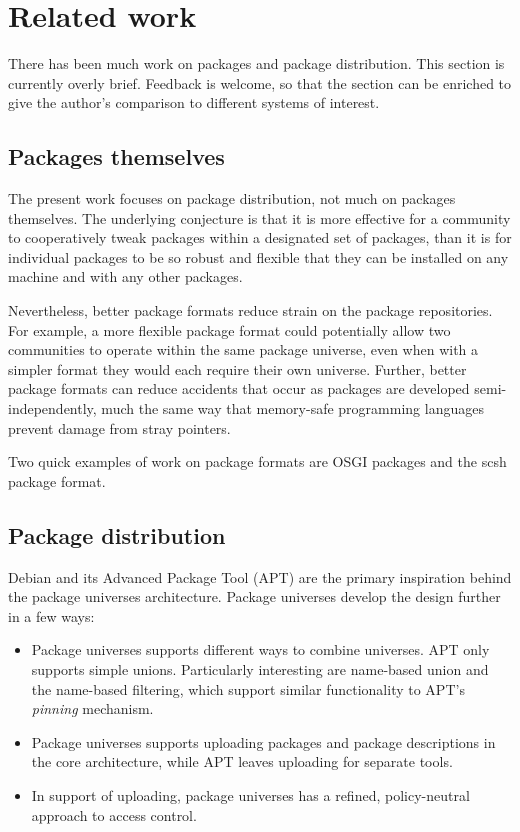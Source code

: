 \documentclass{article}
\begin{document}
\section{Related work}
There has been much work on packages and package distribution.  This
section is currently overly brief.  Feedback is welcome, so that the
section can be enriched to give the author's comparison to different
systems of interest.


\subsection{Packages themselves}
The present work focuses on package distribution, not much on packages
themselves.  The underlying conjecture is that it is more effective
for a community to cooperatively tweak packages within a designated
set of packages, than it is for individual packages to be so robust
and flexible that they can be installed on any machine and with any
other packages.


Nevertheless, better package formats reduce strain on the package
repositories.  For example, a more flexible package format could
potentially allow two communities to operate within the same package
universe, even when with a simpler format they would each require
their own universe.  Further, better package formats can reduce
accidents that occur as packages are developed semi-independently,
much the same way that memory-safe programming languages prevent
damage from stray pointers.

Two quick examples of work on package formats are OSGI packages
and the scsh package format.



\subsection{Package distribution}

Debian and its Advanced Package Tool (APT)
are the primary inspiration behind the package universes architecture.
Package universes develop the design further in a few ways:
\begin{itemize}
\item Package universes supports different ways to combine universes.
      APT only supports simple unions.  Particularly interesting are
      name-based union and the name-based filtering, which support
      similar functionality to APT's \emph{pinning} mechanism.

\item Package universes supports uploading packages and package
      descriptions in the core architecture, while APT leaves
      uploading for separate tools.

\item In support of uploading, package universes has a refined,
      policy-neutral approach to access control.
\end{itemize}
\end{document}

